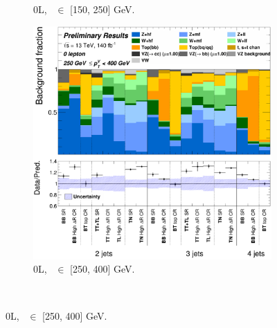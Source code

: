 \begin{figure}[h!]
{\begin{subfigure}[b]{0.37\textwidth}
            \caption{0L, \ptv\ $\in$ [150, 250] GeV.}
            \label{fig:backCom_0L_1}
        \end{subfigure}
        \begin{subfigure}[b]{0.37\textwidth}
            \centering
            \includegraphics[width=\textwidth]{Images/VH/Own_fit/backCom_uncPrefit/GlobalFit_unconditional__Prefit/C_SRCRs_L0_BMax400_BMin250.png}
            \caption{0L, \ptv\ $\in$ [250, 400] GeV.}
            \label{fig:backCom_0L_2}
        \end{subfigure} 
    }\\
\end{figure}
